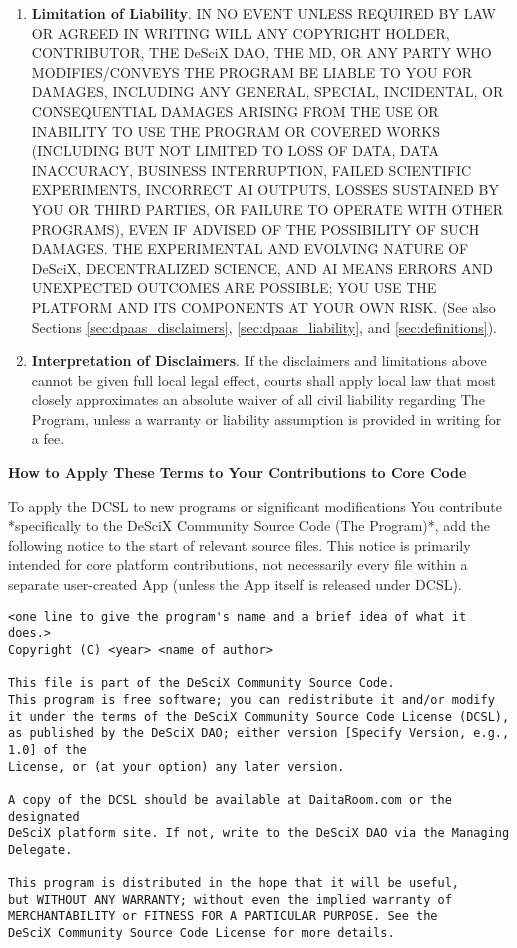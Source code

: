 \documentclass{article}
\begin{document}
\begin{enumerate}
        \item \textbf{Limitation of Liability}. \label{dcsl:liability}
        IN NO EVENT UNLESS REQUIRED BY LAW OR AGREED IN WRITING WILL ANY COPYRIGHT HOLDER, CONTRIBUTOR, THE DeSciX DAO, THE MD, OR ANY PARTY WHO MODIFIES/CONVEYS THE PROGRAM BE LIABLE TO YOU FOR DAMAGES, INCLUDING ANY GENERAL, SPECIAL, INCIDENTAL, OR CONSEQUENTIAL DAMAGES ARISING FROM THE USE OR INABILITY TO USE THE PROGRAM OR COVERED WORKS (INCLUDING BUT NOT LIMITED TO LOSS OF DATA, DATA INACCURACY, BUSINESS INTERRUPTION, FAILED SCIENTIFIC EXPERIMENTS, INCORRECT AI OUTPUTS, LOSSES SUSTAINED BY YOU OR THIRD PARTIES, OR FAILURE TO OPERATE WITH OTHER PROGRAMS), EVEN IF ADVISED OF THE POSSIBILITY OF SUCH DAMAGES. THE EXPERIMENTAL AND EVOLVING NATURE OF DeSciX, DECENTRALIZED SCIENCE, AND AI MEANS ERRORS AND UNEXPECTED OUTCOMES ARE POSSIBLE; YOU USE THE PLATFORM AND ITS COMPONENTS AT YOUR OWN RISK. (See also Sections \ref{sec:dpaas_disclaimers}, \ref{sec:dpaas_liability}, and \ref{sec:definitions}).

        \item \textbf{Interpretation of Disclaimers}.
        If the disclaimers and limitations above cannot be given full local legal effect, courts shall apply local law that most closely approximates an absolute waiver of all civil liability regarding The Program, unless a warranty or liability assumption is provided in writing for a fee.
    \end{enumerate}


\textbf{How to Apply These Terms to Your Contributions to Core Code}

To apply the DCSL to new programs or significant modifications You contribute *specifically to the DeSciX Community Source Code (The Program)*, add the following notice to the start of relevant source files. This notice is primarily intended for core platform contributions, not necessarily every file within a separate user-created App (unless the App itself is released under DCSL).

\begin{verbatim}
<one line to give the program's name and a brief idea of what it does.>
Copyright (C) <year> <name of author>

This file is part of the DeSciX Community Source Code.
This program is free software; you can redistribute it and/or modify
it under the terms of the DeSciX Community Source Code License (DCSL),
as published by the DeSciX DAO; either version [Specify Version, e.g., 1.0] of the
License, or (at your option) any later version.

A copy of the DCSL should be available at DaitaRoom.com or the designated
DeSciX platform site. If not, write to the DeSciX DAO via the Managing Delegate.

This program is distributed in the hope that it will be useful,
but WITHOUT ANY WARRANTY; without even the implied warranty of
MERCHANTABILITY or FITNESS FOR A PARTICULAR PURPOSE. See the
DeSciX Community Source Code License for more details.
\end{verbatim}
\end{document}
